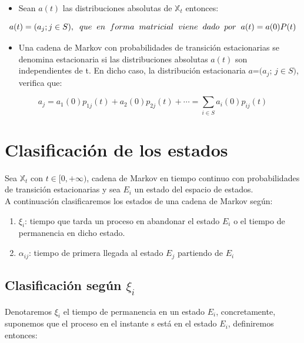 \documentclass[12pt,a4paper]{article}
\begin{document}
	
	\begin{itemize}
\item Sean $a(t)$ las distribuciones absolutas de $\mathbb{X}_{t}$ entonces: 

\end{itemize}
\begin{equation*}
  a(t)=(a_{j}; j\in{S}),\hspace{0.2cm} que \hspace{0.2cm} en \hspace{0.2cm}forma\hspace{0.2cm} matricial\hspace{0.2cm} viene \hspace{0.2cm} dado\hspace{0.2cm} por \hspace{0.2cm} a(t)=a(0)P(t)
\end{equation*}

\begin{itemize}
	 \item	Una cadena de Markov con probabilidades de transición estacionarias se denomina estacionaria si las distribuciones absolutas
	 	$a(t)$ son independientes de t. En dicho caso, la distribución estacionaria $a$=$(a_{j}$; $j\in{S})$, verifica que:
\end{itemize}
\begin{equation*}
a_{j}=a_{1}(0)p_{1j}(t)+a_{2}(0)p_{2j}(t)+\cdots=\sum_{i\in{S}} a_{i}(0)p_{ij}(t)
\end{equation*}

\section{Clasificación de los estados}
	Sea $\mathbb{X}_{t}$ con $t\in[0,+\infty)$,  cadena de Markov en tiempo continuo con probabilidades de transición estacionarias y sea $E_{i}$ un estado del espacio de estados.
	\\
		A continuación clasificaremos los estados de una cadena de Markov según:
	
	\begin{enumerate}
		\item $\xi_{i}$: tiempo que tarda un proceso en abandonar el estado $E_{i}$ o el tiempo de permanencia en dicho estado.
		\item $\alpha_{ij}$: tiempo de primera llegada al estado $E_{j}$ partiendo de $E_{i}$
	\end{enumerate}
		

\subsection{Clasificación según \textbf{$\xi_{i}$}}
 Denotaremos $\xi_{i}$ el tiempo de permanencia en un estado $E_{i}$, concretamente, suponemos que el proceso en el instante s está en el estado $E_{i}$, definiremos entonces:
\end{document}
